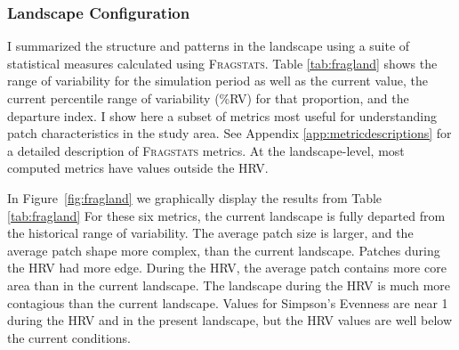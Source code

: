 \clearpage



\subsubsection{Landscape Configuration}
I summarized the structure and patterns in the landscape using a suite of statistical measures calculated using \textsc{Fragstats}. Table \ref{tab:fragland} shows the range of variability for the simulation period as well as the current value, the current percentile range of variability (\%RV) for that proportion, and the departure index. I show here a subset of metrics most useful for understanding patch characteristics in the study area. See Appendix \ref{app:metricdescriptions} for a detailed description of \textsc{Fragstats} metrics. At the landscape-level, most computed metrics have values outside the HRV. 

In Figure~\ref{fig:fragland} we graphically display the results from Table \ref{tab:fragland} For these six metrics, the current landscape is fully departed from the historical range of variability. The average patch size is larger, and the average patch shape more complex, than the current landscape. Patches during the HRV had more edge. During the HRV, the average patch contains more core area than in the current landscape. The landscape during the HRV is much more contagious than the current landscape. Values for Simpson's Evenness are near 1 during the HRV and in the present landscape, but the HRV values are well below the current conditions.


